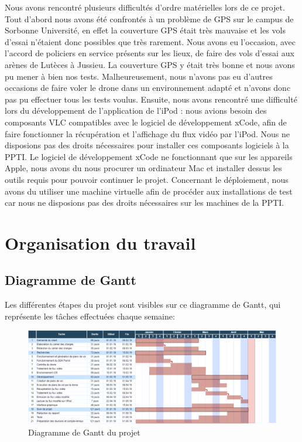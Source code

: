 \documentclass{article}
\begin{document}
	Nous avons rencontré plusieurs difficultés d'ordre matérielles lors de ce projet.
	\medbreak
	Tout d'abord nous avons été confrontés à un problème de GPS sur le campus de Sorbonne Université, en effet la couverture GPS était très mauvaise et les vols d'essai n'étaient donc possibles que très rarement. Nous avons eu l'occasion, avec l'accord de policiers en service présents sur les lieux, de faire des vols d'essai aux arènes de Lutèces à Jussieu. La couverture GPS y était très bonne et nous avons pu mener à bien nos tests. Malheureusement, nous n'avons pas eu d'autres occasions de faire voler le drone dans un environnement adapté et n'avons donc pas pu effectuer tous les tests voulus.
	\medbreak
	Ensuite, nous avons rencontré une difficulté lors du développement de l'application de l'iPod : nous avions besoin des composants VLC compatibles avec le logiciel de développement xCode, afin de faire fonctionner la récupération et l'affichage du flux vidéo par l'iPod. Nous ne disposions pas des droits nécessaires pour installer ces composants logiciels à la PPTI. Le logiciel de développement xCode ne fonctionnant que sur les appareils Apple, nous avons du nous procurer un ordinateur Mac et installer dessus les outils requis pour pouvoir continuer le projet.
	\medbreak
	Concernant le déploiement, nous avons du utiliser une machine virtuelle afin de procéder aux installations de test car nous ne disposions pas des droits nécessaires sur les machines de la PPTI.
	
	
\section{Organisation du travail}
	\subsection{Diagramme de Gantt}
    Les différentes étapes du projet sont visibles sur ce diagramme de Gantt, qui représente les tâches effectuées chaque semaine:
    \begin{center}
	\begin{figure}[!h]
	\includegraphics[scale=0.4]{gantt.png}
	\caption{Diagramme de Gantt du projet}
	\end{figure}
    \end{center}
    
\end{document}
